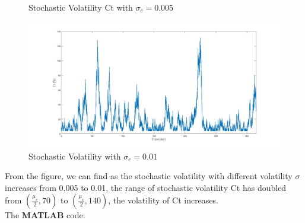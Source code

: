 \documentclass[12pt,letterpaper]{article}
\begin{document}
\begin{enumerate}[label=\textbf{(\Alph*)}]
\begin{figure}[H]
            \caption{Stochastic Volatility Ct with $\sigma_c=0.005$}
            \label{fig:4_g1}
            \includegraphics[width=15cm]{figures/p1_ex4_g2.jpg}
            \caption{Stochastic Volatility with $\sigma_c=0.01$}
            \label{fig:4_g2}
        \end{figure}
From the figure, we can find as the stochastic volatility with different volatility $\sigma$ increases from 0.005 to 0.01, the range of stochastic volatility Ct has doubled from $(\frac{\mu_c}{2},70)$ to  $(\frac{\mu_c}{2},140)$, the volatility of Ct increases.\\

The \textbf{MATLAB} code:
   
    
   
\end{enumerate}
\end{document}
